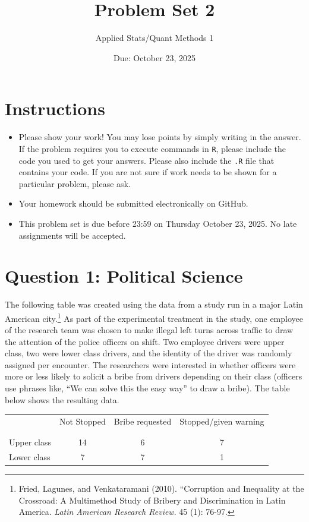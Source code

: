 \documentclass[12pt,letterpaper]{article}
\title{Problem Set 2}
\date{Due: October 23, 2025}
\author{Applied Stats/Quant Methods 1}
\begin{document}
	\maketitle
	\section*{Instructions}
\begin{itemize}
	\item Please show your work! You may lose points by simply writing in the answer. If the problem requires you to execute commands in \texttt{R}, please include the code you used to get your answers. Please also include the \texttt{.R} file that contains your code. If you are not sure if work needs to be shown for a particular problem, please ask.
	\item Your homework should be submitted electronically on GitHub.
	\item This problem set is due before 23:59 on Thursday October 23, 2025. No late assignments will be accepted.

\end{itemize}

	
	\vspace{.5cm}
	\section*{Question 1: Political Science}
		\vspace{.25cm}
	The following table was created using the data from a study run in a major Latin American city.\footnote{Fried, Lagunes, and Venkataramani (2010). ``Corruption and Inequality at the Crossroad: A Multimethod Study of Bribery and Discrimination in Latin America. \textit{Latin American Research Review}. 45 (1): 76-97.} As part of the experimental treatment in the study, one employee of the research team was chosen to make illegal left turns across traffic to draw the attention of the police officers on shift. Two employee drivers were upper class, two were lower class drivers, and the identity of the driver was randomly assigned per encounter. The researchers were interested in whether officers were more or less likely to solicit a bribe from drivers depending on their class (officers use phrases like, ``We can solve this the easy way'' to draw a bribe). The table below shows the resulting data.

\newpage
\begin{table}[h!]
	\centering
	\begin{tabular}{l | c c c }
		& Not Stopped & Bribe requested & Stopped/given warning \\
		\\[-1.8ex] 
		\hline \\[-1.8ex]
		Upper class & 14 & 6 & 7 \\
		Lower class & 7 & 7 & 1 \\
		\hline
	\end{tabular}
\end{table}
\end{document}
